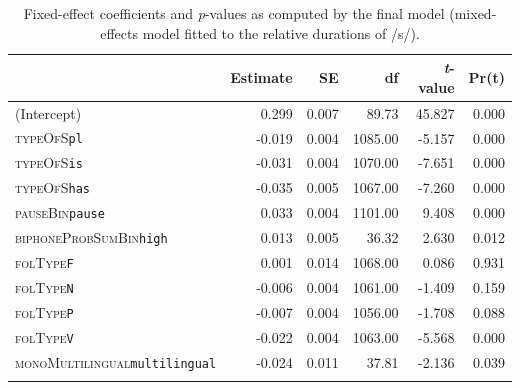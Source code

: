 \begin{table}\fontsize{10}{11}
\caption{Fixed-effect coefficients and \textit{p}-values as computed by the final model (mixed-effects model fitted to the relative durations of /s/).}
\label{tab:4.10}
\centering
\begin{tabular}{lrrrrr} 
\lsptoprule
~                            & Estimate & SE    & df      & \textit{t}-value & Pr(\textbar{}t\textbar{})  \\ 
\midrule
(Intercept)                  & 0.299    & 0.007 & 89.73   & 45.827           & 0.000                      \\
\textsc{typeOfS}\texttt{pl}                    & -0.019   & 0.004 & 1085.00 & -5.157           & 0.000                      \\
\textsc{typeOfS}\texttt{is}                    & -0.031   & 0.004 & 1070.00 & -7.651           & 0.000                      \\
\textsc{typeOfS}\texttt{has}                   & -0.035   & 0.005 & 1067.00 & -7.260           & 0.000                      \\
\textsc{pauseBin}\texttt{pause}                & 0.033    & 0.004 & 1101.00 & 9.408            & 0.000                      \\
\textsc{biphoneProbSumBin}\texttt{high}        & 0.013    & 0.005 & 36.32   & 2.630            & 0.012                      \\
\textsc{folType}\texttt{F}                     & 0.001    & 0.014 & 1068.00 & 0.086            & 0.931                      \\
\textsc{folType}\texttt{N}                     & -0.006   & 0.004 & 1061.00 & -1.409           & 0.159                      \\
\textsc{folType}\texttt{P}                     & -0.007   & 0.004 & 1056.00 & -1.708           & 0.088                      \\
\textsc{folType}\texttt{V}                     & -0.022   & 0.004 & 1063.00 & -5.568           & 0.000                      \\
\textsc{monoMultilingual}\texttt{multilingual} & -0.024   & 0.011 & 37.81   & -2.136           & 0.039                      \\
\lspbottomrule
\end{tabular}
\end{table}





